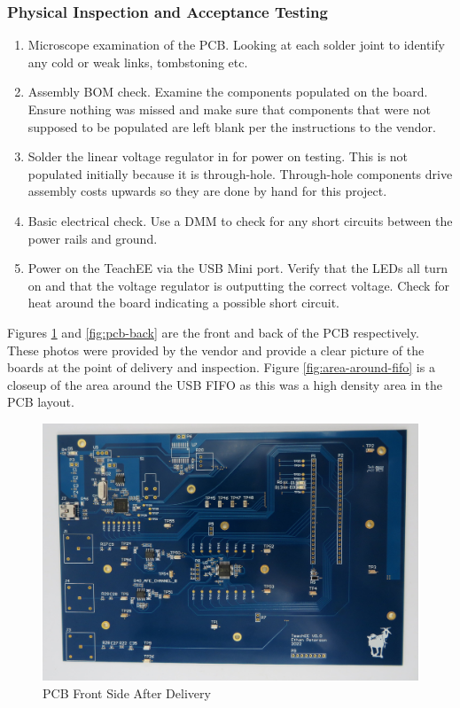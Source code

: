 \documentclass[letterpaper,11pt]{article}
\begin{document}
\subsubsection{Physical Inspection and Acceptance Testing}
\begin{enumerate}
  \item Microscope examination of the PCB. Looking at each solder joint to
    identify any cold or weak links, tombstoning etc.
  \item Assembly BOM check. Examine the components populated on the board.
    Ensure nothing was missed and make sure that components that were not
    supposed to be populated are left blank per the instructions to the vendor.
  \item Solder the linear voltage regulator in for power on testing. This is not
    populated initially because it is through-hole. Through-hole components
    drive assembly costs upwards so they are done by hand for this project.
  \item Basic electrical check. Use a DMM to check for any short circuits
    between the power rails and ground.
  \item Power on the TeachEE via the USB Mini port. Verify that the LEDs all
    turn on and that the voltage regulator is outputting the correct voltage.
    Check for heat around the board indicating a possible short circuit.
\end{enumerate}

Figures \ref{fig:pcb-front} and \ref{fig:pcb-back} are the front and back of the
PCB respectively. These photos were provided by the vendor and provide a clear
picture of the boards at the point of delivery and inspection. Figure
\ref{fig:area-around-fifo} is a closeup of the area around the USB FIFO as this
was a high density area in the PCB layout.

\begin{figure}[H]
  \centering
  \includegraphics[width=\textwidth]{figures/pcb-front.JPG}
  \caption{PCB Front Side After Delivery}
  \label{fig:pcb-front}
\end{figure}
\end{document}
